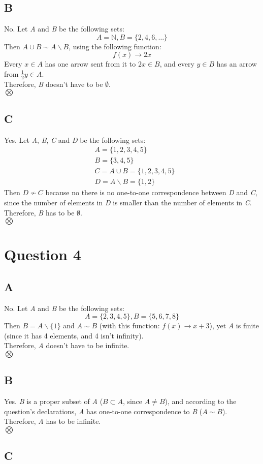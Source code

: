 \documentclass[12pt, oneside]{article}
\begin{document}
\subsection{B}
No. Let \emph{A} and \emph{B} be the following sets:
\begin{equation*}
A = \mathbb{N}, B = \{2, 4, 6, \ldots\}
\end{equation*}
Then $A \cup B \sim A \backslash B$, using the following function:
\begin{equation*}
f(x) \rightarrow 2x
\end{equation*}
Every $x \in A$ has one arrow sent from it to $2x \in B$, and every $y \in B$ has an arrow from $\frac{1}{2}y \in A$.\\
Therefore, \emph{B} doesn't have to be $\emptyset$.\\
$\bigotimes$

\subsection{C}
Yes. Let \emph{A}, \emph{B}, \emph{C} and \emph{D} be the following sets:
\begin{equation*}
\begin{split}
& A = \{1, 2, 3, 4, 5\}\\
& B = \{3, 4, 5\}\\
& C = A \cup B = \{1, 2, 3, 4, 5\}\\
& D = A \backslash B = \{1, 2\}
\end{split}
\end{equation*}
Then $D \nsim C$ because no there is no one-to-one correspondence between \emph{D} and \emph{C}, since the number of elements in \emph{D} is smaller than the number of elements in \emph{C}.\\
Therefore, \emph{B} has to be $\emptyset$.\\
$\bigotimes$
\clearpage

\section{Question 4}
\subsection{A}
No. Let \emph{A} and \emph{B} be the following sets:
\begin{equation*}
A = \{2, 3, 4, 5\}, B = \{5, 6, 7, 8\}
\end{equation*}
Then $B = A\backslash\{1\}$ and $A \sim B$ (with this function: $f(x) \rightarrow x + 3$), yet \emph{A} is finite (since it has 4 elements, and 4 isn't infinity).\\
Therefore, \emph{A} doesn't have to be infinite.\\
$\bigotimes$

\subsection{B}
Yes. \emph{B} is a proper subset of \emph{A} ($B \subset A$, since $A \neq B$), and according to the question's declarations, \emph{A} has one-to-one correspondence to \emph{B} ($A \sim B$).\\
Therefore, \emph{A} has to be infinite.\\
$\bigotimes$

\subsection{C}
\end{document}
